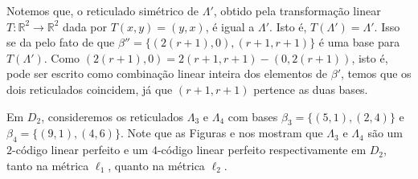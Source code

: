 \documentclass{article}
\theoremstyle{plain}
\theoremstyle{definition}
\theoremstyle{remark}
\begin{document}
Notemos que, o reticulado simétrico de $\Lambda'$, obtido pela transformação linear $T: \mathbb{R}^2 \to \mathbb{R}^2$ dada por $T(x,y) = (y,x)$, é igual a $\Lambda'$. Isto é, $T(\Lambda') = \Lambda'$. Isso se da pelo fato de que $\beta''=\{(2(r+1),0),(r+1,r+1)\}$ é uma base para $T(\Lambda')$. Como $(2(r+1),0) = 2(r+1,r+1)-(0,2(r+1))$, isto é, pode ser escrito como combinação linear inteira dos elementos de $\beta'$, temos que os dois reticulados coincidem, já que $(r+1,r+1)$ pertence as duas bases.

Em $D_2$, consideremos os reticulados $\Lambda_3$ e $\Lambda_4$ com bases $\beta_3 = \{(5,1),(2,4)\}$ e $\beta_4 = \{(9,1),(4,6)\}$. Note que as Figuras e nos mostram que $\Lambda_3$ e $\Lambda_4$ são um $2$-código linear perfeito e um $4$-código linear perfeito respectivamente em $D_2$, tanto na métrica $\ell_1$, quanto na métrica $\ell_2$.
\end{document}
